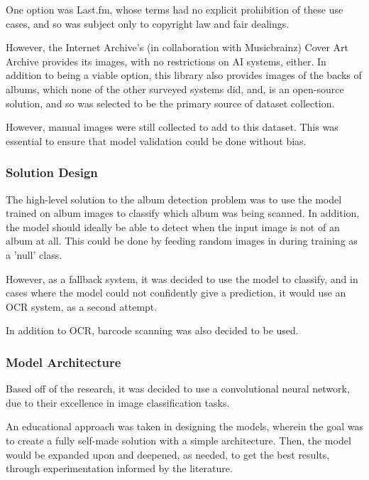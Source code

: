                 One option was Last.fm, whose terms had no explicit prohibition of these use cases, and so was subject only to copyright law and fair dealings.
    
                However, the Internet Archive's (in collaboration with Musicbrainz) Cover Art Archive provides its images, with no restrictions on AI systems, either. In addition to being a viable option, this library also provides images of the backs of albums, which none of the other surveyed systems did, and, is an open-source solution, and so was selected to be the primary source of dataset collection.
    
                However, manual images were still collected to add to this dataset. This was essential to ensure that model validation could be done without bias.
    
            \subsubsection{Solution Design}
    
                The high-level solution to the album detection problem was to use the model trained on album images to classify which album was being scanned. In addition, the model should ideally be able to detect when the input image is not of an album at all. This could be done by feeding random images in during training as a 'null' class.
    
                However, as a fallback system, it was decided to use the model to classify, and in cases where the model could not confidently give a prediction, it would use an OCR system, as a second attempt.
    
                In addition to OCR, barcode scanning was also decided to be used.
        
            \subsubsection{Model Architecture}
    
                Based off of the research, it was decided to use a convolutional neural network, due to their excellence in image classification tasks.
    
                An educational approach was taken in designing the models, wherein the goal was to create a fully self-made solution with a simple architecture. Then, the model would be expanded upon and deepened, as needed, to get the best results, through experimentation informed by the literature.
    
